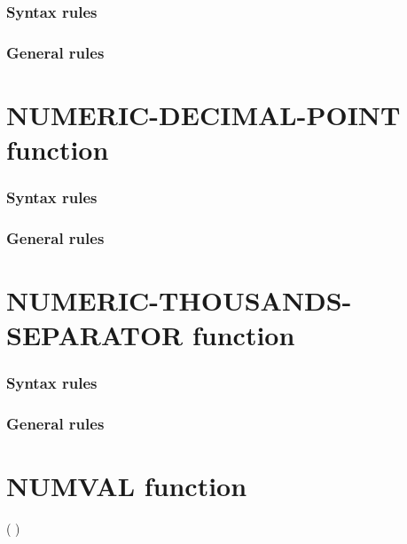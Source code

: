\subsubsection{Syntax rules}

\subsubsection{General rules}

\section{NUMERIC-DECIMAL-POINT function}

\begin{syntax}[\gnucobolcolour]
   
\end{syntax}

\subsubsection{Syntax rules}

\subsubsection{General rules}

\section{NUMERIC-THOUSANDS-SEPARATOR function}

\begin{syntax}[\gnucobolcolour]
   
\end{syntax}

\subsubsection{Syntax rules}

\subsubsection{General rules}

\section{NUMVAL function}

\begin{syntax}
    ( \argument )
\end{syntax}

